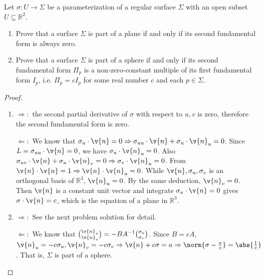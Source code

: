 \begin{problem}
Let $\sigma: U\to \Sigma $ be a parameterization of a regular surface $\Sigma$ with an open subset $U\subseteq \mathbb{R}^2$.
\begin{enumerate}[label=(\arabic*)]
\item Prove that a surface $\Sigma$ is part of a plane if and only if its second fundamental form is always zero.
\item Prove that a surface $\Sigma$ is part of a sphere if and only if its second fundamental form $\Pi_p$ is a non-zero-constant multiple of its first fundamental form $I_p$, i.e. $\Pi_p = c I_p$ for some real number $c$ and each $p\in \Sigma$.
\end{enumerate}
\end{problem}
\begin{solution}
\begin{proof}\mbox{}
\begin{enumerate}[label=(\arabic*)]
\item $\Rightarrow:$ the second partial derivative of $\sigma$ with respect to $u,v$ is zero, therefore the second fundamental form is zero.

$\Leftarrow: $ We know that $\sigma_u \cdot \v{n} = 0 \Rightarrow \sigma_{uu} \cdot \v{n} + \sigma_{u} \cdot \v{n}_u =0$. Since $L=\sigma_{uu}\cdot \v{n}=0$, we have $ \sigma_{u} \cdot \v{n}_u =0$. 
Also $\sigma_{uv} \cdot \v{n} + \sigma_{u} \cdot \v{n}_v =0 \Rightarrow \sigma_v \cdot \v{n}_u = 0$. From $\v{n}\cdot \v{n} = 1 \Rightarrow \v{n}\cdot \v{n}_u = 0 $. While $\v{n},\sigma_u,\sigma_v$ is an orthogonal basis of $\mathbb{R}^3$, $\v{n}_u=0$. By the same deduction, $\v{n}_v=0$. Then $\v{n}$ is a constant unit vector and integrate $\sigma_u\cdot \v{n}=0$ gives $\sigma \cdot \v{n}=c$, which is the equation of a plane in $\mathbb{R}^3$.
\item $\Rightarrow:$ See the next problem solution for detail.

$\Leftarrow:$ We know that $\binom{\v{n}_u}{\v{n}_v} = -BA^{-1} \binom{\sigma_u}{\sigma_v}$. Since $B=c A$, $\v{n}_u=-c \sigma_u, \v{n}_v = -c \sigma_v \Rightarrow \v{n} + c\sigma = a \Rightarrow \norm{\sigma-{a \over c}} = \abs{{1\over c}}$. That is, $\Sigma$ is part of a sphere.
\end{enumerate}
\end{proof}
\end{solution}

